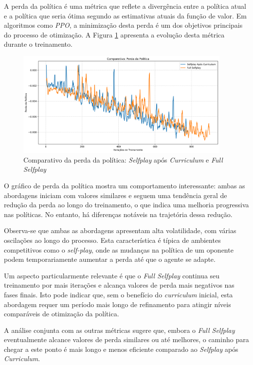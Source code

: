 A perda da política é uma métrica que reflete a divergência entre a política atual e a política que seria ótima segundo as estimativas atuais da função de valor. Em algoritmos como \textit{PPO}, a minimização desta perda é um dos objetivos principais do processo de otimização. A Figura \ref{fig:policy_loss} apresenta a evolução desta métrica durante o treinamento.

\begin{figure}[H]
    \centering
    \includegraphics[width=0.95\textwidth]{fig/graficos_trabalho/graficos_experimentos/geral/comparativo_perda_politica.png}
    \caption{Comparativo da perda da política: \textit{Selfplay} após \textit{Curriculum} e \textit{Full Selfplay}}
    \label{fig:policy_loss}
\end{figure}

O gráfico de perda da política mostra um comportamento interessante: ambas as abordagens iniciam com valores similares e seguem uma tendência geral de redução da perda ao longo do treinamento, o que indica uma melhoria progressiva nas políticas. No entanto, há diferenças notáveis na trajetória dessa redução.

Observa-se que ambas as abordagens apresentam alta volatilidade, com várias oscilações ao longo do processo. Esta característica é típica de ambientes competitivos como o \textit{self-play}, onde as mudanças na política de um oponente podem temporariamente aumentar a perda até que o agente se adapte.

Um aspecto particularmente relevante é que o \textit{Full Selfplay} continua seu treinamento por mais iterações e alcança valores de perda mais negativos nas fases finais. Isto pode indicar que, sem o benefício do \textit{curriculum} inicial, esta abordagem requer um período mais longo de refinamento para atingir níveis comparáveis de otimização da política.

A análise conjunta com as outras métricas sugere que, embora o \textit{Full Selfplay} eventualmente alcance valores de perda similares ou até melhores, o caminho para chegar a este ponto é mais longo e menos eficiente comparado ao \textit{Selfplay} após \textit{Curriculum}.

